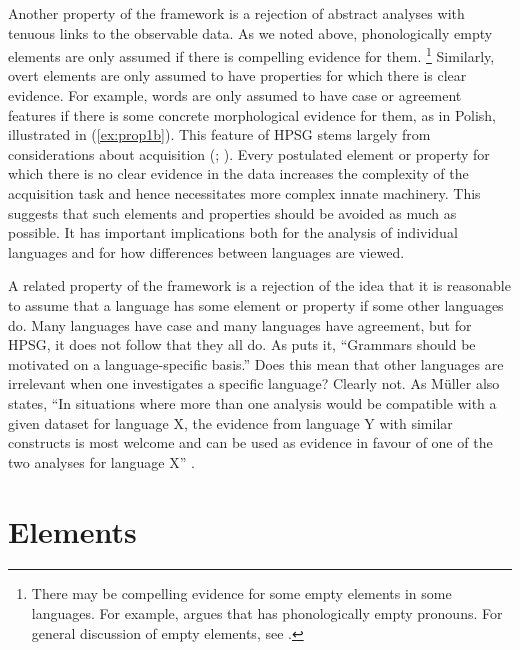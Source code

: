 \documentclass[output=paper
	        ,collection
	        ,collectionchapter
 	        ,biblatex
                ,babelshorthands
                ,newtxmath
                ,draftmode
                ,colorlinks, citecolor=brown
]{langscibook}
\begin{document}
Another property of the framework is a rejection of abstract analyses with tenuous links to the observable data. As we noted above, phonologically empty elements are only assumed if there is compelling evidence for them.%
%
\footnote{There may be compelling evidence for some empty elements in some languages. For example, \citet[Section~8]{Borsley2009a-u} argues that  has phonologically empty pronouns. For general discussion of empty elements, see \citet[Chapter~19.2]{MuellerGT-Eng1}.}
%
Similarly, overt elements are only assumed to have properties for which there is clear evidence. For example, words are only assumed to have case or agreement features if there is some concrete morphological evidence for them, as in Polish, illustrated in (\ref{ex:prop1b}). This feature of HPSG stems largely from considerations about acquisition (\citealt[Chapter~19]{MuellerGT-Eng1}; %
). Every postulated element or property for which there is no clear evidence in the data increases the complexity of the acquisition task and hence necessitates more complex innate machinery. This suggests that such elements and properties should be avoided as much as possible. It has important implications both for the analysis of individual languages and for how differences between languages are viewed.
	
A related property of the framework is a rejection of the idea that it is reasonable to assume that a language has some element or property if some other languages do. Many languages have case and many languages have agreement, but for HPSG, it does not follow that they all do. As \citet[25]{MuellerCoreGram} puts it, “Grammars should be motivated on a language-specific basis.” Does this mean that other languages are irrelevant when one investigates a specific language? Clearly not. As Müller also states, “In situations where more than one analysis would be compatible with a given dataset for language X, the evidence from language Y with similar constructs is most welcome and can be used as evidence in favour of one of the two analyses for language X” \citep[43]{MuellerCoreGram}.


\section{Elements}\label{sec:prop3}
\label{prop:sec-elements}
\end{document}
